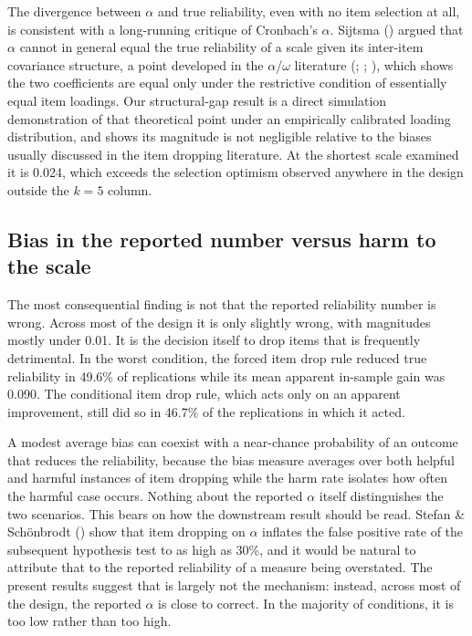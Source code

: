 \documentclass[
  nonatbib,
  authoryear,
  preprint]{elsarticle}
\begin{document}
The divergence between \(\alpha\) and true reliability, even with no
item selection at all, is consistent with a long-running critique of
Cronbach's \(\alpha\). Sijtsma ()
argued that \(\alpha\) cannot in general equal the true reliability of a
scale given its inter-item covariance structure, a point developed in
the \(\alpha\)/\(\omega\) literature
(;
;
), which
shows the two coefficients are equal only under the restrictive
condition of essentially equal item loadings. Our structural-gap result
is a direct simulation demonstration of that theoretical point under an
empirically calibrated loading distribution, and shows its magnitude is
not negligible relative to the biases usually discussed in the item
dropping literature. At the shortest scale examined it is 0.024, which
exceeds the selection optimism observed anywhere in the design outside
the \(k = 5\) column.

\subsection{Bias in the reported number versus harm to the
scale}\label{bias-in-the-reported-number-versus-harm-to-the-scale}

The most consequential finding is not that the reported reliability
number is wrong. Across most of the design it is only slightly wrong,
with magnitudes mostly under 0.01. It is the decision itself to drop
items that is frequently detrimental. In the worst condition, the forced
item drop rule reduced true reliability in 49.6\% of replications while
its mean apparent in-sample gain was 0.090. The conditional item drop
rule, which acts only on an apparent improvement, still did so in 46.7\%
of the replications in which it acted.

A modest average bias can coexist with a near-chance probability of an
outcome that reduces the reliability, because the bias measure averages
over both helpful and harmful instances of item dropping while the harm
rate isolates how often the harmful case occurs. Nothing about the
reported \(\alpha\) itself distinguishes the two scenarios. This bears
on how the downstream result should be read. Stefan \& Schönbrodt
() show that item dropping on
\(\alpha\) inflates the false positive rate of the subsequent hypothesis
test to as high as 30\%, and it would be natural to attribute that to
the reported reliability of a measure being overstated. The present
results suggest that is largely not the mechanism: instead, across most
of the design, the reported \(\alpha\) is close to correct. In the
majority of conditions, it is too low rather than too high.
\end{document}
